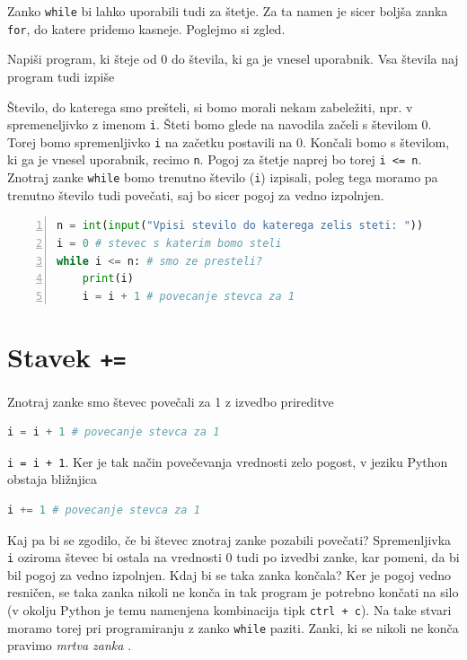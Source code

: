 Zanko \texttt{while} bi lahko uporabili tudi za štetje. Za ta namen je sicer boljša zanka \texttt{for}, do katere pridemo kasneje. Poglejmo si zgled.
\begin{zgled}
Napiši program, ki šteje od 0 do števila, ki ga je vnesel uporabnik. Vsa števila naj program tudi izpiše
\end{zgled}
\begin{resitev}
Število, do katerega smo prešteli, si bomo morali nekam zabeležiti, npr. v spremeneljivko z imenom \texttt{i}. Šteti bomo glede na navodila začeli s številom 0. Torej bomo spremenljivko \texttt{i} na začetku postavili na 0. Končali bomo s številom, ki ga je vnesel uporabnik, recimo \texttt{n}. Pogoj za štetje naprej bo torej \texttt{i <= n}. Znotraj zanke \texttt{while} bomo trenutno število (\texttt{i}) izpisali, poleg tega moramo pa trenutno število tudi povečati, saj bo sicer pogoj za vedno izpolnjen. 
\begin{lstlisting}[language=Python,numbers=left]
n = int(input("Vpisi stevilo do katerega zelis steti: "))
i = 0 # stevec s katerim bomo steli
while i <= n: # smo ze presteli?
    print(i)
    i = i + 1 # povecanje stevca za 1
\end{lstlisting}
\end{resitev}

\section{Stavek \texttt{+=}}
Znotraj zanke smo števec povečali za 1 z izvedbo prireditve
\begin{lstlisting}[language=Python]
i = i + 1 # povecanje stevca za 1
\end{lstlisting}
\texttt{i = i + 1}. Ker je tak način povečevanja vrednosti zelo pogost, v jeziku Python obstaja bližnjica
\begin{lstlisting}[language=Python]
i += 1 # povecanje stevca za 1
\end{lstlisting}


Kaj pa bi se zgodilo, če bi števec znotraj zanke pozabili povečati? Spremenljivka \texttt{i} oziroma števec bi ostala na vrednosti 0 tudi po izvedbi zanke, kar pomeni, da bi bil pogoj za vedno izpolnjen. Kdaj bi se taka zanka končala? Ker je pogoj vedno resničen, se taka zanka nikoli ne konča in tak program je potrebno končati na silo (v okolju Python je temu namenjena kombinacija tipk \texttt{ctrl + c}). Na take stvari moramo torej pri programiranju z zanko \texttt{while} paziti. Zanki, ki se nikoli ne konča pravimo \emph{mrtva zanka} .

